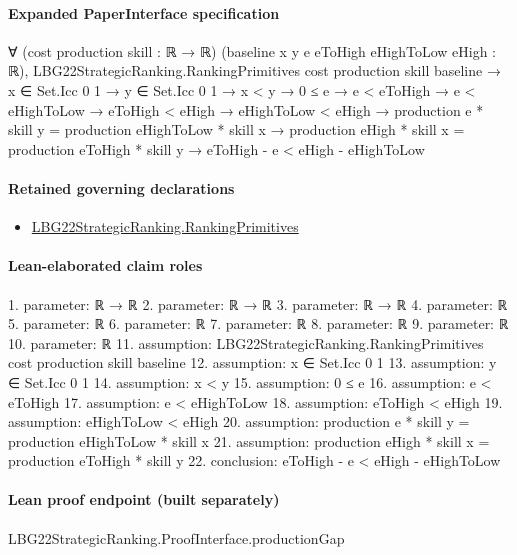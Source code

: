 \documentclass[10pt]{article}
\begin{document}
\paragraph{Expanded PaperInterface specification}
\begin{ReviewVerbatim}
∀ (cost production skill : ℝ → ℝ) (baseline x y e eToHigh eHighToLow eHigh : ℝ),
  LBG22StrategicRanking.RankingPrimitives cost production skill baseline →
    x ∈ Set.Icc 0 1 →
      y ∈ Set.Icc 0 1 →
        x < y →
          0 ≤ e →
            e < eToHigh →
              e < eHighToLow →
                eToHigh < eHigh →
                  eHighToLow < eHigh →
                    production e * skill y = production eHighToLow * skill x →
                      production eHigh * skill x = production eToHigh * skill y → eToHigh - e < eHigh - eHighToLow
\end{ReviewVerbatim}

\paragraph{Retained governing declarations}
\begin{itemize}\raggedright
\item \hyperlink{paper-prerequisite-9bbcc12f4a1736bf}{LBG22\allowbreak{}Strategic\allowbreak{}Ranking.\allowbreak{}Ranking\allowbreak{}Primitives}
\end{itemize}
\paragraph{Lean-elaborated claim roles}\begin{ReviewVerbatim}
1. parameter: ℝ → ℝ
2. parameter: ℝ → ℝ
3. parameter: ℝ → ℝ
4. parameter: ℝ
5. parameter: ℝ
6. parameter: ℝ
7. parameter: ℝ
8. parameter: ℝ
9. parameter: ℝ
10. parameter: ℝ
11. assumption: LBG22StrategicRanking.RankingPrimitives cost production skill baseline
12. assumption: x ∈ Set.Icc 0 1
13. assumption: y ∈ Set.Icc 0 1
14. assumption: x < y
15. assumption: 0 ≤ e
16. assumption: e < eToHigh
17. assumption: e < eHighToLow
18. assumption: eToHigh < eHigh
19. assumption: eHighToLow < eHigh
20. assumption: production e * skill y = production eHighToLow * skill x
21. assumption: production eHigh * skill x = production eToHigh * skill y
22. conclusion: eToHigh - e < eHigh - eHighToLow
\end{ReviewVerbatim}

\paragraph{Lean proof endpoint (built separately)}\begin{ReviewVerbatim}
LBG22StrategicRanking.ProofInterface.productionGap
\end{ReviewVerbatim}
\end{document}
